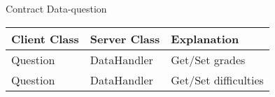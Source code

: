 \begin{subsubsection}{Contract Data-question}
	\begin{tabular}{l l l }
	  Client Class & Server Class & Explanation\\ \hline
	  Question & DataHandler & Get/Set grades\\
	  Question & DataHandler & Get/Set difficulties\\
	\end{tabular}
\end{subsubsection}
